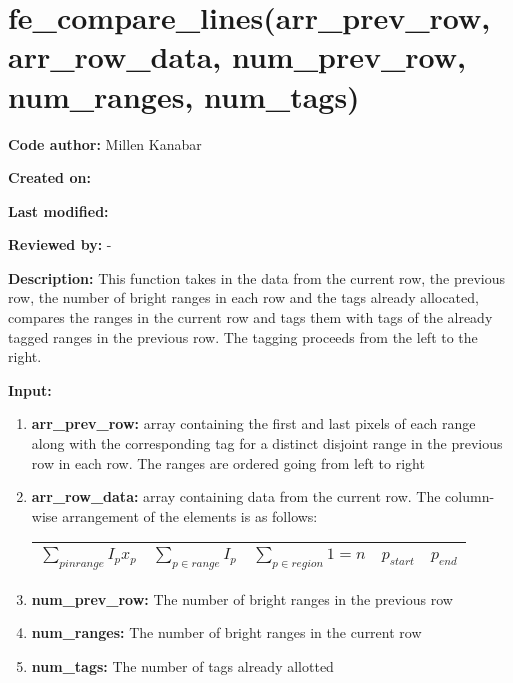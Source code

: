 \documentclass[a4paper, oneside,11pt]{article}
\begin{document}
    
\section*{fe\_compare\_lines(arr\_prev\_row, arr\_row\_data, num\_prev\_row, num\_ranges, num\_tags)}
\textbf{Code author:} Millen Kanabar


\textbf{Created on:}


\textbf{Last modified:}


\textbf{Reviewed by:} -


\textbf{Description:}
    This function takes in the data from the current row, the previous row, the number of bright ranges in each row and the tags already allocated, compares the ranges in the current row and tags them with tags of the already tagged ranges in the previous row.
    The tagging proceeds from the left to the right.
    
\textbf{Input:}
\begin{enumerate}
    \item \textbf{arr\_prev\_row:} array containing the first and last pixels of each range along with the corresponding tag for a distinct disjoint range in the previous row in each row. The ranges are ordered going from left to right
    \item \textbf{arr\_row\_data:} array containing data from the current row. The column-wise arrangement of the elements is as follows:
    
    \begin{tabular}{|c|c|c|c|c|}
        \hline
        $ \sum_{p in range} I_p x_p $ & $ \sum_{p \in range} I_p $  & $\sum_{p \in region} 1 = n $  & $ p_{start} $  & $ p_{end} $ \\
        \hline
    \end{tabular}

    \item \textbf{num\_prev\_row:} The number of bright ranges in the previous row
    \item \textbf{num\_ranges:} The number of bright ranges in the current row
    \item \textbf{num\_tags:} The number of tags already allotted
\end{enumerate}
\end{document}
